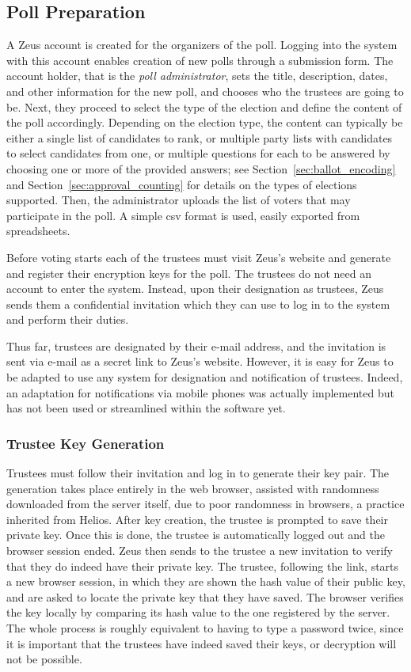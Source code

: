 \documentclass[jets]{usenixjournal}
\begin{document}
\subsection{Poll Preparation}
A Zeus account is created for the organizers of the poll.
Logging into the system with this account enables creation of new polls
through a submission form.
The account holder, that is the \emph{poll administrator},
sets the title, description, dates, and other information for the new
poll, and chooses who the trustees are going to be.
Next, they proceed to select the type of the election and define the
content of the poll accordingly.
Depending on the election type,
the content can typically be either a single list of candidates to rank,
or multiple party lists with candidates to select candidates from one,
or multiple questions for each to be answered by choosing one or more of
the provided answers; see Section~\ref{sec:ballot_encoding} 
and Section~\ref{sec:approval_counting} for details on the types of elections 
supported. Then, the administrator uploads the list of voters that may 
participate in the poll. A simple {\sc csv} format is used, easily 
exported from spreadsheets.

Before voting starts each of the trustees must visit Zeus's website
and generate and register their encryption keys for the poll.
The trustees do not need an account to enter the system.
Instead, upon their designation as trustees, Zeus sends them a
confidential invitation which they can use to log in to the system
and perform their duties.

Thus far, trustees are designated by their e-mail address, and the
invitation is sent via e-mail as a secret link to Zeus's website.
However, it is easy for Zeus to be adapted to use any system for
designation and notification of trustees. Indeed, an adaptation 
for notifications via mobile phones was actually implemented but
has not been used or streamlined within the software yet.

\subsubsection{Trustee Key Generation}
Trustees must follow their invitation and log in to generate their key
pair. The generation takes place entirely in the web browser, assisted
with randomness downloaded from the server itself, due to poor
randomness in browsers, a practice inherited from Helios. After key
creation, the trustee is prompted to save their private key. Once this
is done, the trustee is automatically logged out and the browser
session ended. Zeus then sends to the trustee a new invitation to
verify that they do indeed have their private key. The trustee,
following the link, starts a new browser session, in which they are
shown the hash value of their public key, and are asked to
locate the private key that they have saved. The browser verifies
the key locally by comparing its hash value to the one registered by
the server. The whole process is roughly equivalent to having to type
a password twice, since it is important that the trustees have indeed
saved their keys, or decryption will not be possible.
\end{document}
